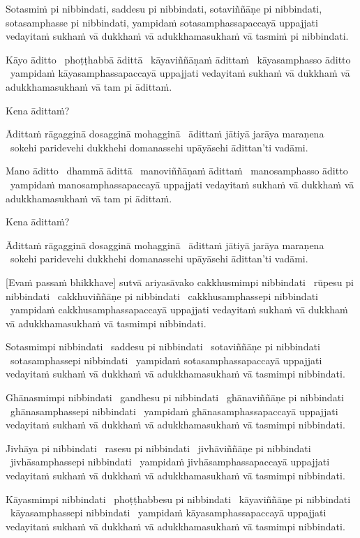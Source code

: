 Sotasmiṁ pi nibbindati, saddesu pi nibbindati, sotaviññāṇe pi
nibbindati, sotasamphasse pi nibbindati, yampidaṁ sotasamphassapaccayā
uppajjati vedayitaṁ sukhaṁ vā dukkhaṁ vā adukkhamasukhaṁ vā tasmiṁ pi
nibbindati.

Kāyo āditto \breathmark\ phoṭṭhabbā ādittā \breathmark\ kāyaviññāṇaṁ ādittaṁ \breathmark\ kāyasamphasso āditto \breathmark\ yampidaṁ kāyasamphassapaccayā uppajjati vedayitaṁ sukhaṁ vā dukkhaṁ vā adukkhamasukhaṁ vā tam pi ādittaṁ.

Kena ādittaṁ?

Ādittaṁ rāgagginā dosagginā mohagginā \breathmark\ ādittaṁ jātiyā jarāya maraṇena \breathmark\ sokehi paridevehi dukkhehi domanassehi upāyāsehi ādittan’ti vadāmi.

Mano āditto \breathmark\ dhammā ādittā \breathmark\ manoviññāṇaṁ ādittaṁ \breathmark\ manosamphasso āditto \breathmark\ yampidaṁ manosamphassapaccayā uppajjati vedayitaṁ sukhaṁ vā dukkhaṁ vā adukkhamasukhaṁ vā tam pi ādittaṁ.

Kena ādittaṁ?

Ādittaṁ rāgagginā dosagginā mohagginā \breathmark\ ādittaṁ jātiyā jarāya maraṇena \breathmark\ sokehi paridevehi dukkhehi domanassehi upāyāsehi ādittan’ti vadāmi.

[Evaṁ passaṁ bhikkhave] sutvā ariyasāvako cakkhusmimpi nibbindati \breathmark\ rūpesu pi nibbindati \breathmark\ cakkhuviññāṇe pi nibbindati \breathmark\ cakkhusamphassepi nibbindati \breathmark\ yampidaṁ cakkhusamphassapaccayā uppajjati vedayitaṁ sukhaṁ vā dukkhaṁ vā adukkhamasukhaṁ vā tasmimpi nibbindati.

Sotasmimpi nibbindati \breathmark\ saddesu pi nibbindati \breathmark\ sotaviññāṇe pi nibbindati \breathmark\ sotasamphassepi nibbindati \breathmark\ yampidaṁ sotasamphassapaccayā uppajjati vedayitaṁ sukhaṁ vā dukkhaṁ vā adukkhamasukhaṁ vā tasmimpi nibbindati.

Ghānasmimpi nibbindati \breathmark\ gandhesu pi nibbindati \breathmark\ ghānaviññāṇe pi nibbindati \breathmark\ ghānasamphassepi nibbindati \breathmark\ yampidaṁ ghānasamphassapaccayā uppajjati vedayitaṁ sukhaṁ vā dukkhaṁ vā adukkhamasukhaṁ vā tasmimpi nibbindati.

Jivhāya pi nibbindati \breathmark\ rasesu pi nibbindati \breathmark\ jivhāviññāṇe pi nibbindati \breathmark\ jivhāsamphassepi nibbindati \breathmark\ yampidaṁ jivhāsamphassapaccayā uppajjati vedayitaṁ sukhaṁ vā dukkhaṁ vā adukkhamasukhaṁ vā tasmimpi nibbindati.

Kāyasmimpi nibbindati \breathmark\ phoṭṭhabbesu pi nibbindati \breathmark\ kāyaviññāṇe pi nibbindati \breathmark\ kāyasamphassepi nibbindati \breathmark\ yampidaṁ kāyasamphassapaccayā uppajjati vedayitaṁ sukhaṁ vā dukkhaṁ vā adukkhamasukhaṁ vā tasmimpi nibbindati.

